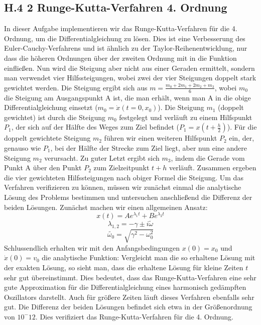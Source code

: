 \documentclass[ngerman]{scrartcl}
\begin{document}
\subsection{H.4 2 Runge-Kutta-Verfahren 4. Ordnung}
In dieser Aufgabe implementieren wir das Runge-Kutta-Verfahren für die 4. Ordnung, um die Differentialgleichung zu lösen. Dies ist eine Verbesserung des Euler-Cauchy-Verfahrens und ist ähnlich zu der Taylor-Reihenentwicklung, nur dass die höheren Ordnungen über der zweiten Ordnung mit in die Funktion einfließen. Nun wird die Steigung aber nicht aus einer Geraden ermittelt, sondern man verwendet vier Hilfssteigungen, wobei zwei der vier Steigungen doppelt stark gewichtet werden. Die Steigung ergibt sich aus $m=\frac{m_{0}+2 m_{1}+2 m_{2}+m_{3}}{6}$, wobei $m_{0}$ die Steigung am Ausgangspunkt A ist, die man erhält, wenn man A in die obige Differentialgleichung einsetzt ($m_{0}=\dot{x}(t=0,x_{0})$). Die Steigung $m_{1}$ (doppelt gewichtet) ist durch die Steigung $m_{0}$ festgelegt und verläuft zu einem Hilfspunkt $P_{1}$, der sich auf der Hälfte des Weges zum Ziel befindet ($P_{1}=x(t+\frac{h}{2})$). Für die doppelt gewichtete Steigung $m_{2}$ führen wir einen weiteren Hilfspunkt $P_{2}$ ein, der, genauso wie $P_{1}$, bei der Hälfte der Strecke zum Ziel liegt, aber nun eine andere Steigung $m_{2}$ verursacht. Zu guter Letzt ergibt sich $m_{3}$, indem die Gerade vom Punkt A über den Punkt $P_{2}$ zum Zielzeitpunkt $t+h$ verläuft. Zusammen ergeben die vier gewichteten Hilfssteigungen nach obiger Formel die Steigung. Um das Verfahren verifizieren zu können, müssen wir zunächst einmal die analytische Lösung des Problems bestimmen und untersuchen anschließend die Differenz der beiden Lösungen. Zunächst machen wir einen allgemeinen Ansatz:
\begin{equation} x(t)=Ae^{\lambda_{1}t} + Be^{\lambda_{2}t}\end{equation}
\begin{equation}\lambda_{1,2}= - \gamma \pm i\tilde{\omega}\end{equation}
\begin{equation}\tilde{\omega_0}=\sqrt{\gamma^2 - \omega^2_0}\end{equation}
Schlussendlich erhalten wir mit den Anfangsbedingungen $x(0)=x_0$ und $\dot{x}(0)=v_0$ die analytische Funktion:
Vergleicht man die so erhaltene Lösung mit der exakten Lösung, so sieht man, dass die erhaltene Lösung für kleine Zeiten $t$ sehr gut übereinstimmt. Dies bedeutet, dass das Runge-Kutta-Verfahren eine sehr gute Approximation für die Differentialgleichung eines harmonisch gedämpften Oszillators darstellt. Auch für größere Zeiten läuft dieses Verfahren ebenfalls sehr gut. Die Differenz der beiden Lösungen befindet sich etwa in der Größenordnung von $10^-12$. Dies verifiziert das Runge-Kutta-Verfahren für die 4. Ordnung.
\end{document}
